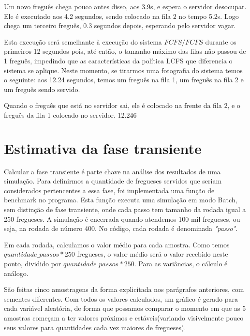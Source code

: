 \documentclass[a4paper,10pt]{article}
\begin{document}
    Um novo freguês chega pouco antes disso, aos 3.9s, e espera o servidor desocupar. Ele é executado aos 4.2 segundos, sendo colocado na fila 2 no tempo 5.2s. Logo chega um terceiro freguês, 0.3 segundos depois, esperando pelo servidor vagar.

    Esta execução será semelhante à execução do sistema $FCFS/FCFS$ durante os primeiros 12 segundos pois, até então, o tamanho máximo das filas não passou de 1 freguês, impedindo que as características da política LCFS que diferencia o sistema se aplique. Neste momento, se tirarmos uma fotografia do sistema temos o seguinte: aos 12.24 segundos, temos um freguês na fila 1, um freguês na fila 2 e um freguês sendo servido.

    Quando o freguês que está no servidor sai, ele é colocado na frente da fila 2, e o freguês da fila 1 colocado no servidor. 12.246




\pagebreak

\section{Estimativa da fase transiente}

    Calcular a fase transiente é parte chave na análise dos resultados de uma simulação. Para definirmos a quantidade de fregueses servidos que seriam considerados pertencentes a essa fase, foi implementada uma função de benchmark no programa. Esta função executa uma simulação em modo Batch, sem distinção de fase transiente, onde cada passo tem tamanho da rodada igual a 250 fregueses. A simulação é encerrada quando atendemos 100 mil fregueses, ou seja, na rodada de número 400. No código, cada rodada é denominada \emph{"passo"}.

    Em cada rodada, calculamos o valor médio para cada amostra. Como temos $quantidade\_passos * 250$ fregueses, o valor médio será o valor recebido neste ponto, dividido por $quantidade\_passos * 250$. Para as variâncias, o cálculo é análogo.

    São feitas cinco amostragens da forma explicitada nos parágrafos anteriores, com sementes diferentes. Com todos os valores calculados, um gráfico é gerado para cada variável aleatória, de forma que possamos comparar o momento em que as 5 amostras começam a ter valores próximos e estáveis(variando visivelmente pouco seus valores para quantidades cada vez maiores de fregueses).
\end{document}
